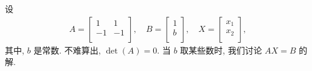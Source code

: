 \documentclass[../libro.tex]{subfiles}
\begin{document}
\begin{example}
    设
    \begin{align*}
        A =
        \begin{bmatrix}
            1  & 1  \\
            -1 & -1 \\
        \end{bmatrix},
        \quad
        B =
        \begin{bmatrix}
            1 \\
            b \\
        \end{bmatrix},
        \quad
        X =
        \begin{bmatrix}
            x_1 \\
            x_2 \\
        \end{bmatrix},
    \end{align*}
    其中, \(b\) 是常数.
    不难算出, \(\det {(A)} = 0\).
    当 \(b\) 取某些数时,
    我们讨论 \(AX = B\) 的解.


\end{example}
\end{document}
